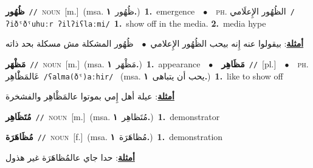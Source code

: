 \documentclass[10pt,a4paper,twoside]{article} %
\begin{document}
\begin{multicols}{2}
{\setlength\topsep{0pt}\textbf{\foreignlanguage{arabic}{ظُهُور}}\ {\color{gray}\texttt{//}\color{black}}\ \textsc{noun}\ [m.]\ \color{gray}(msa. \foreignlanguage{arabic}{ظُهُور}~\foreignlanguage{arabic}{\textbf{١.}})\color{black}\ \textbf{1.}~emergence\ \ $\bullet$\ \ \textsc{ph.} \color{gray} \foreignlanguage{arabic}{الظُهُور الإِعلَامي}\color{black}\ {\color{gray}\texttt{/{\sffamily ʔiðˤðˤuhuːr ʔilʔiʕlaːmi}/}\color{black}}\ \textbf{1.}~show off in the media.  \textbf{2.}~media hype\  \begin{flushright}\color{gray}\foreignlanguage{arabic}{\textbf{\underline{\foreignlanguage{arabic}{أمثلة}}}: بيقولوا عنه إِنه بيحب الظُهُور الإِعلامي\ $\bullet$\ \  ظُهُور المشكلة مش مسكلة بحد ذاته}\end{flushright}\color{black}} \vspace{2mm}

{\setlength\topsep{0pt}\textbf{\foreignlanguage{arabic}{مَظْهَر}}\ {\color{gray}\texttt{//}\color{black}}\ \textsc{noun}\ [m.]\ \color{gray}(msa. \foreignlanguage{arabic}{مَظْهَر}~\foreignlanguage{arabic}{\textbf{١.}})\color{black}\ \textbf{1.}~appearance\ \ $\bullet$\ \ \setlength\topsep{0pt}\textbf{\foreignlanguage{arabic}{مَظَاهِر}}\ {\color{gray}\texttt{//}\color{black}}\ [pl.]\ \ $\bullet$\ \ \textsc{ph.} \color{gray} \foreignlanguage{arabic}{عَالمَظَْاهِر}\color{black}\ {\color{gray}\texttt{/{\sffamily ʕalma(ðˤ)aːhir}/}\color{black}}\ \color{gray} (msa. \foreignlanguage{arabic}{يحب أن يتباهى}~\foreignlanguage{arabic}{\textbf{١.}})\color{black}\ \textbf{1.}~like to show off\  \begin{flushright}\color{gray}\foreignlanguage{arabic}{\textbf{\underline{\foreignlanguage{arabic}{أمثلة}}}: عيلة أهل إِمي بموتوا عالمَظْاهِر والفشخرة}\end{flushright}\color{black}} \vspace{2mm}

{\setlength\topsep{0pt}\textbf{\foreignlanguage{arabic}{مُتَظَاهِر}}\ {\color{gray}\texttt{//}\color{black}}\ \textsc{noun}\ [m.]\ \color{gray}(msa. \foreignlanguage{arabic}{مُتَظاهِر}~\foreignlanguage{arabic}{\textbf{١.}})\color{black}\ \textbf{1.}~demonstrator\ } \vspace{2mm}

{\setlength\topsep{0pt}\textbf{\foreignlanguage{arabic}{مُظَاهَرَة}}\ {\color{gray}\texttt{//}\color{black}}\ \textsc{noun}\ [f.]\ \color{gray}(msa. \foreignlanguage{arabic}{مُظاهَرَة}~\foreignlanguage{arabic}{\textbf{١.}})\color{black}\ \textbf{1.}~demonstration\  \begin{flushright}\color{gray}\foreignlanguage{arabic}{\textbf{\underline{\foreignlanguage{arabic}{أمثلة}}}: حدا جاي عالمُظاهَرَة غير هذول}\end{flushright}\color{black}} \vspace{2mm}


\end{multicols}
\end{document}
